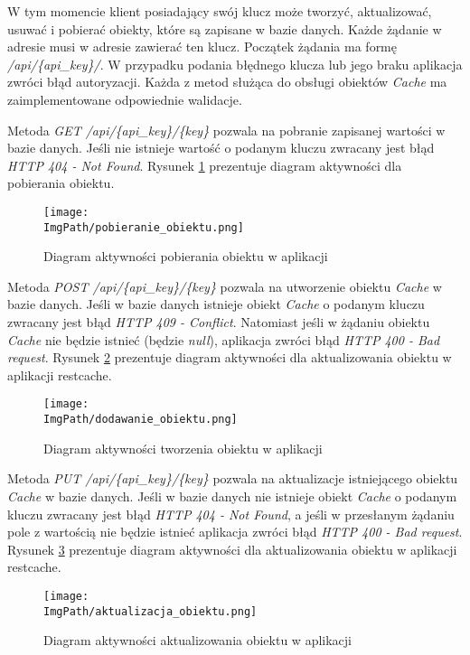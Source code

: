 W tym momencie klient posiadający swój klucz może tworzyć, aktualizować, usuwać i pobierać obiekty, które są zapisane w bazie danych. Każde żądanie w adresie musi w adresie zawierać ten klucz. Początek żądania ma formę \textsl{/api/\{api\_key\}/}. W przypadku podania błędnego klucza lub jego braku aplikacja zwróci błąd autoryzacji. Każda z metod służąca do obsługi obiektów \textsl{Cache} ma zaimplementowane odpowiednie walidacje. 

Metoda \textsl{GET /api/\{api\_key\}/\{key\}} pozwala na pobranie zapisanej wartości w bazie danych. Jeśli nie istnieje wartość o podanym kluczu zwracany jest błąd \textsl{HTTP 404 - Not Found}. Rysunek \ref{fig:pobieranie_obiektu} prezentuje diagram aktywności dla pobierania obiektu.
\begin{figure}[!ht]
\centering
\texttt{[image: \\ImgPath/pobieranie\_obiektu.png]}
\caption{Diagram aktywności pobierania obiektu w aplikacji}
\label{fig:pobieranie_obiektu}
\end{figure}

Metoda \textsl{POST /api/\{api\_key\}/\{key\}} pozwala na utworzenie obiektu \textsl{Cache} w bazie danych. Jeśli w bazie danych istnieje obiekt \textsl{Cache} o podanym kluczu zwracany jest błąd \textsl{HTTP 409 - Conflict}. Natomiast jeśli w żądaniu obiektu \textsl{Cache} nie będzie istnieć (będzie \textsl{null}), aplikacja zwróci błąd \textsl{HTTP 400 - Bad request}.  Rysunek \ref{fig:tworzenie_obiektu} prezentuje diagram aktywności dla aktualizowania obiektu w aplikacji restcache.
\begin{figure}[!ht]
\centering
\texttt{[image: \\ImgPath/dodawanie\_obiektu.png]}
\caption{Diagram aktywności tworzenia obiektu w aplikacji}
\label{fig:tworzenie_obiektu}
\end{figure}

Metoda \textsl{PUT /api/\{api\_key\}/\{key\}} pozwala na aktualizacje istniejącego obiektu \textsl{Cache} w bazie danych. Jeśli w bazie danych  nie istnieje obiekt \textsl{Cache} o podanym kluczu zwracany jest błąd \textsl{HTTP 404 - Not Found}, a  jeśli w przesłanym żądaniu pole z wartością nie będzie istnieć aplikacja zwróci błąd \textsl{HTTP 400 - Bad request}. Rysunek \ref{fig:aktualizowanie_obiektu} prezentuje diagram aktywności dla aktualizowania obiektu w aplikacji restcache.
\begin{figure}[!ht]
\centering
\texttt{[image: \\ImgPath/aktualizacja\_obiektu.png]}
\caption{Diagram aktywności aktualizowania obiektu w aplikacji}
\label{fig:aktualizowanie_obiektu}
\end{figure}

